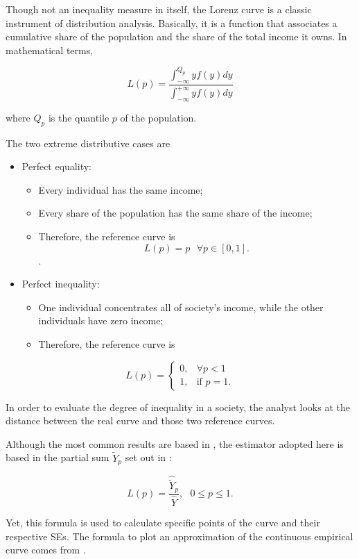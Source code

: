 \documentclass[]{book}
\providecommand{\tightlist}{%
  \setlength{\itemsep}{0pt}\setlength{\parskip}{0pt}}
\begin{document}
Though not an inequality measure in itself, the Lorenz curve is a
classic instrument of distribution analysis. Basically, it is a function
that associates a cumulative share of the population and the share of
the total income it owns. In mathematical terms,

\[
L(p) = \frac{\int_{-\infty}^{Q_p}yf(y)dy}{\int_{-\infty}^{+\infty}yf(y)dy}
\]

where \(Q_p\) is the quantile \(p\) of the population.

The two extreme distributive cases are

\begin{itemize}
\tightlist
\item
  Perfect equality:

  \begin{itemize}
  \tightlist
  \item
    Every individual has the same income;
  \item
    Every share of the population has the same share of the income;
  \item
    Therefore, the reference curve is
    \[L(p) = p \text{ } \forall p \in [0,1] \text{.}\].
  \end{itemize}
\item
  Perfect inequality:

  \begin{itemize}
  \tightlist
  \item
    One individual concentrates all of society's income, while the other
    individuals have zero income;
  \item
    Therefore, the reference curve is
  \end{itemize}
\end{itemize}

\[
L(p)=
\begin{cases}
0, &\forall p < 1 \\
1, &\text{if } p = 1 \text{.}
\end{cases}
\]

In order to evaluate the degree of inequality in a society, the analyst
looks at the distance between the real curve and those two reference
curves.

Although the most common results are based in \citep{kovacevic1997}, the
estimator adopted here is based in the partial sum \(\widetilde{Y}_p\)
set out in \citep{langel2012}:

\[
L(p) = \frac{\widehat{\widetilde{Y}}_p}{\widehat{Y}}, \text{ } 0 \le p \le 1.
\]

Yet, this formula is used to calculate specific points of the curve and
their respective SEs. The formula to plot an approximation of the
continuous empirical curve comes from \citep{lerman1989}.
\end{document}
